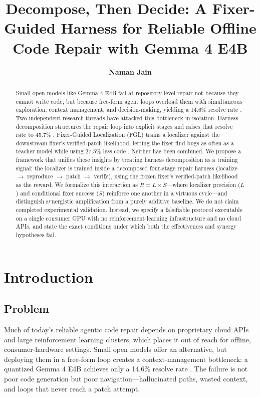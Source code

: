 \documentclass[11pt,a4paper]{article}
\title{\textbf{Decompose, Then Decide: A Fixer-Guided Harness for Reliable Offline Code Repair with Gemma 4 E4B}}
\author{\textbf{Naman Jain}}
\date{}
\begin{document}
\maketitle

\begin{abstract}
\noindent Small open models like Gemma 4 E4B fail at repository-level repair not because they cannot write code, but because free-form agent loops overload them with simultaneous exploration, context management, and decision-making, yielding a 14.6\% resolve rate \cite{LOOP}. Two independent research threads have attacked this bottleneck in isolation. Harness decomposition structures the repair loop into explicit stages and raises that resolve rate to 45.7\% \cite{LOOP}. Fixer-Guided Localization (FGL) trains a localizer against the downstream fixer's verified-patch likelihood, letting the fixer find bugs as often as a teacher model while using 27.5\% less code \cite{FGL}. Neither has been combined. We propose a framework that unifies these insights by treating harness decomposition as a training signal: the localizer is trained inside a decomposed four-stage repair harness (localize $\rightarrow$ reproduce $\rightarrow$ patch $\rightarrow$ verify), using the frozen fixer's verified-patch likelihood as the reward. We formalize this interaction as $R = L \times S$---where localizer precision ($L$) and conditional fixer success ($S$) reinforce one another in a virtuous cycle---and distinguish synergistic amplification from a purely additive baseline. We do not claim completed experimental validation. Instead, we specify a falsifiable protocol executable on a single consumer GPU with no reinforcement learning infrastructure and no cloud APIs, and state the exact conditions under which both the effectiveness and synergy hypotheses fail.
\end{abstract}

\section{Introduction}

\subsection{Problem}
Much of today's reliable agentic code repair depends on proprietary cloud APIs and large reinforcement learning clusters, which places it out of reach for offline, consumer-hardware settings. Small open models offer an alternative, but deploying them in a free-form loop creates a context-management bottleneck: a quantized Gemma 4 E4B achieves only a 14.6\% resolve rate \cite{LOOP}. The failure is not poor code generation but poor navigation---hallucinated paths, wasted context, and loops that never reach a patch attempt.
\end{document}
